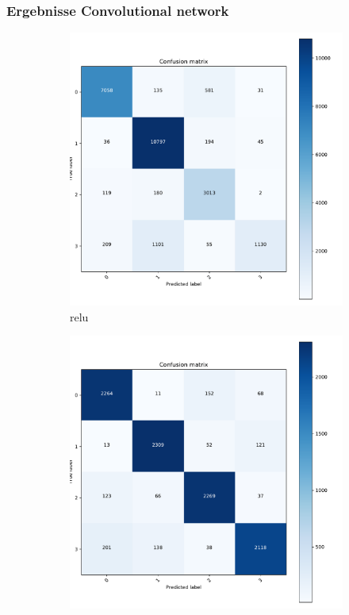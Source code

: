 \documentclass[aspectratio=1610, professionalfonts, 9pt]{beamer}
\begin{document}
\begin{frame}
    \frametitle{Ergebnisse Convolutional network}
    \begin{figure}[H]%
        \begin{subfigure}{0.3\textwidth}%
            \includegraphics[width=1.2\linewidth]{images/confusion_matrix_relu.pdf}%
            \caption{relu}%
        \end{subfigure}%
        \hfill%
        \begin{subfigure}{0.3\textwidth}%
            \includegraphics[width=1.2\linewidth]{images/confusion_matrix_equal.pdf}%

\end{subfigure}
\end{figure}
\end{frame}
\end{document}

